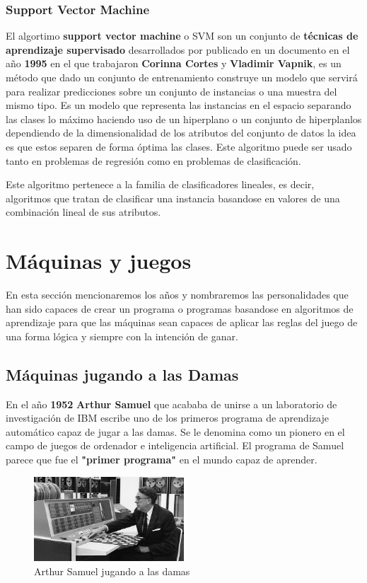 \documentclass[a4paper, 11pt]{article} %
\begin{document}
\subsubsection{Support Vector Machine}
El algortimo \textbf{support vector machine} o SVM son un conjunto de \textbf{técnicas de aprendizaje supervisado} desarrollados por publicado en un documento en el año \textbf{1995} en el que trabajaron \textbf{Corinna Cortes} y \textbf{Vladimir Vapnik}, es un método que dado un conjunto de entrenamiento construye un modelo que servirá para realizar predicciones sobre un conjunto de instancias o una muestra del mismo tipo. Es un modelo que representa las instancias en el espacio separando las clases lo máximo haciendo uso de un hiperplano o un conjunto de hiperplanlos dependiendo de la dimensionalidad de los atributos del conjunto de datos la idea es que estos  separen de forma óptima las clases. Este algoritmo puede ser usado tanto en problemas de regresión como en problemas de clasificación. 

Este algoritmo pertenece a la familia de clasificadores lineales, es decir, algoritmos que tratan de clasificar una instancia basandose en valores de una combinación lineal de sus atributos.

\section{Máquinas y juegos}
En esta sección mencionaremos los años y nombraremos las personalidades que han sido capaces de crear un programa o programas basandose en algoritmos de aprendizaje para que las máquinas sean capaces de aplicar las reglas del juego de una forma lógica y siempre con la intención de ganar.
\subsection{Máquinas jugando a las Damas}
En el año \textbf{1952} \textbf{Arthur Samuel }que acababa de unirse a un laboratorio de investigación de IBM escribe uno de los primeros programa de aprendizaje automático capaz de jugar a las damas. Se le denomina como un pionero en el campo de juegos de ordenador e inteligencia artificial. El programa de Samuel parece que fue el \textbf{"primer programa"} en el mundo capaz de aprender.

\begin{figure}[H]
\centering
\includegraphics[width=0.5\textwidth]{acc}
\caption{Arthur Samuel jugando a las damas}
\label{Ejemplo kNN}
\end{figure}
\end{document}
